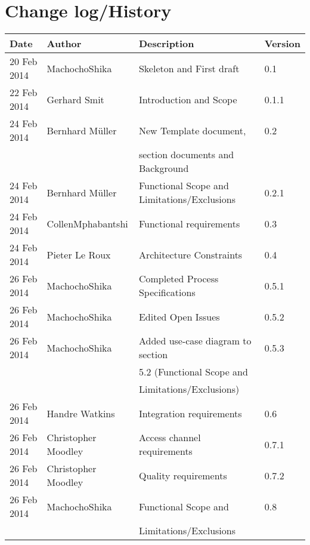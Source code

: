 \documentclass[12pt, a4paper]{scrartcl}
\begin{document}
		\section*{Change log/History}
		\begin{tabular}{| l | l | l | l |}
			\hline
				Date & Author & Description & Version \\
			\hline
				20 Feb 2014 & MachochoShika & Skeleton and First draft & 0.1 \\
			\hline
				22 Feb 2014 & Gerhard Smit & Introduction and Scope & 0.1.1\\
			\hline
				24 Feb 2014 & Bernhard M\"uller & New Template document, & 0.2\\ 
				\phantom & \phantom & section documents and Background & \\
			\hline
				24 Feb 2014 & Bernhard M\"uller & Functional Scope and Limitations/Exclusions	& 0.2.1\\
			\hline
				24 Feb 2014 & CollenMphabantshi & Functional requirements & 0.3\\
			\hline
				24 Feb 2014 & Pieter Le Roux & Architecture Constraints & 0.4\\
			\hline
				26 Feb 2014 & MachochoShika & Completed Process Specifications & 0.5.1\\
			\hline
				26 Feb 2014 & MachochoShika & Edited Open Issues & 0.5.2\\
			\hline
				26 Feb 2014 & MachochoShika & Added use-case diagram to section & 0.5.3 \\
				\phantom & \phantom & 5.2 (Functional Scope and &   \\
				\phantom & \phantom & Limitations/Exclusions) & \\
			\hline
				26 Feb 2014 & Handre Watkins & Integration requirements & 0.6\\
			\hline
				26 Feb 2014 & Christopher Moodley & Access channel requirements & 0.7.1\\
			\hline
				26 Feb 2014 & Christopher Moodley & Quality requirements & 0.7.2\\
			\hline
				26 Feb 2014 & MachochoShika & Functional Scope and & 0.8\\
				\phantom & \phantom & Limitations/Exclusions & \\
			\hline
		\end{tabular}
		\newpage

		\thispagestyle{empty}
		\tableofcontents
		\newpage

		\setcounter{page}{1}
		\pagestyle{plain}
\end{document}
